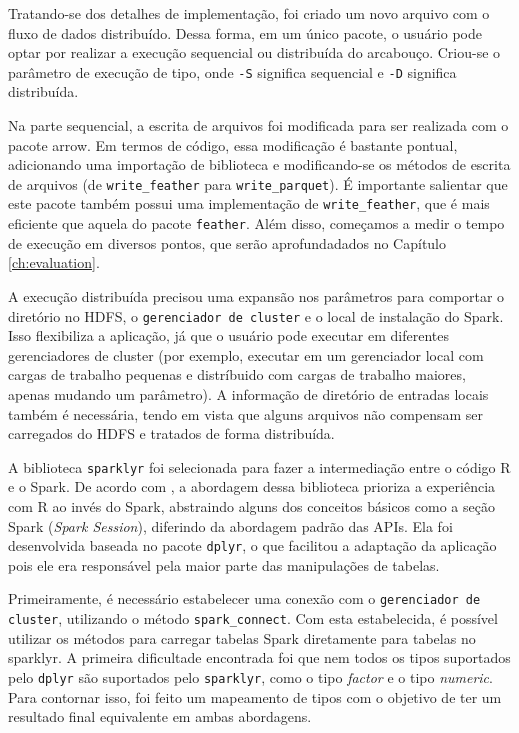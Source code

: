 Tratando-se dos detalhes de implementação, foi criado um novo arquivo com o fluxo de dados distribuído.
Dessa forma, em um único pacote, o usuário pode optar por realizar a execução sequencial ou distribuída do arcabouço.
Criou-se o parâmetro de execução de tipo, onde \texttt{-S} significa sequencial e \texttt{-D} significa distribuída.

Na parte sequencial, a escrita de arquivos foi modificada para ser realizada com o pacote arrow. Em termos de código, essa
modificação é bastante pontual, adicionando uma importação de biblioteca e modificando-se os métodos de escrita de arquivos
(de \texttt{write\_feather} para \texttt{write\_parquet}). É importante salientar que este pacote também possui uma implementação
de \texttt{write\_feather}, que é mais eficiente que aquela do pacote \texttt{feather}. Além disso, começamos a medir o tempo de
execução em diversos pontos, que serão aprofundadados no Capítulo \ref{ch:evaluation}.

A execução distribuída precisou uma expansão nos parâmetros para comportar o diretório no HDFS, o \texttt{gerenciador de cluster} 
e o local de instalação do Spark. Isso flexibiliza a aplicação, já que o usuário pode executar 
em diferentes gerenciadores de cluster (por exemplo, executar em um gerenciador local com cargas de trabalho pequenas e distríbuido
com cargas de trabalho maiores, apenas mudando um parâmetro). A informação de diretório de entradas locais também é necessária, 
tendo em vista que alguns arquivos não compensam ser carregados do HDFS e tratados de forma distribuída.

A biblioteca \texttt{sparklyr} foi selecionada para fazer a intermediação entre o código R e o Spark. De acordo com \citet{}, 
a abordagem dessa biblioteca prioriza a experiência com R ao invés do Spark, abstraindo alguns dos conceitos básicos como 
a seção Spark (\emph{Spark Session}), diferindo da abordagem padrão das APIs. Ela foi desenvolvida baseada no pacote \texttt{dplyr},
o que facilitou a adaptação da aplicação pois ele era responsável pela maior parte das manipulações de tabelas.

Primeiramente, é necessário estabelecer uma conexão com o \texttt{gerenciador de cluster}, utilizando o método \texttt{spark\_connect}.
Com esta estabelecida, é possível utilizar os métodos para carregar tabelas Spark diretamente para tabelas no sparklyr. A primeira
dificultade encontrada foi que nem todos os tipos suportados pelo \texttt{dplyr} são suportados pelo \texttt{sparklyr}, como o tipo \emph{factor} e o tipo \emph{numeric}. Para contornar isso, foi feito um mapeamento de tipos com o objetivo de ter um resultado final equivalente em ambas abordagens.

